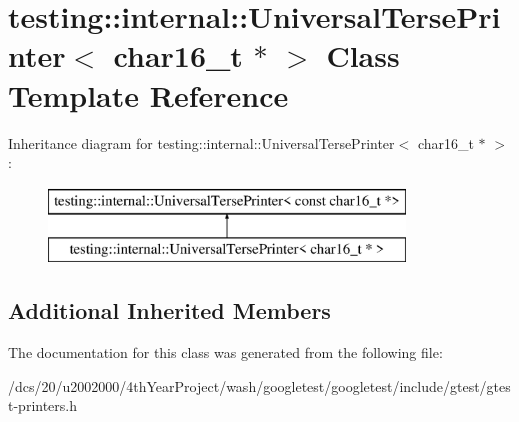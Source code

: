 \hypertarget{classtesting_1_1internal_1_1UniversalTersePrinter_3_01char16__t_01_5_01_4}{}\section{testing\+:\+:internal\+:\+:Universal\+Terse\+Printer$<$ char16\+\_\+t $\ast$ $>$ Class Template Reference}
\label{classtesting_1_1internal_1_1UniversalTersePrinter_3_01char16__t_01_5_01_4}
Inheritance diagram for testing\+:\+:internal\+:\+:Universal\+Terse\+Printer$<$ char16\+\_\+t $\ast$ $>$\+:\begin{figure}[H]
\begin{center}
\leavevmode
\includegraphics[height=2.000000cm]{classtesting_1_1internal_1_1UniversalTersePrinter_3_01char16__t_01_5_01_4}
\end{center}
\end{figure}
\subsection*{Additional Inherited Members}


The documentation for this class was generated from the following file\+:\begin{DoxyCompactItemize}
\item 
/dcs/20/u2002000/4th\+Year\+Project/wash/googletest/googletest/include/gtest/gtest-\/printers.\+h\end{DoxyCompactItemize}
